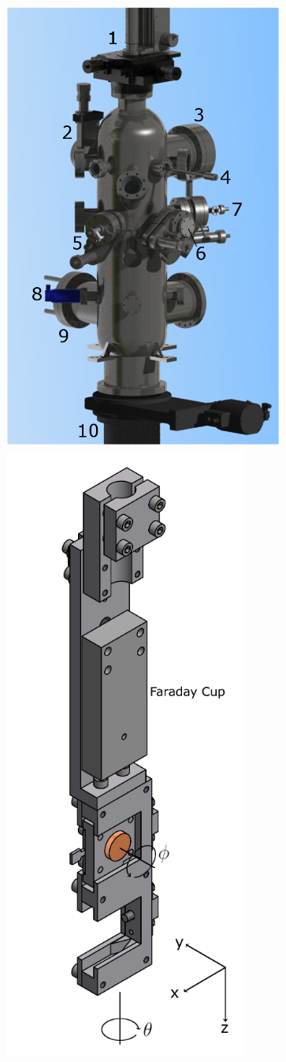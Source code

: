 \begin{figure}[h!]
    \centering
    \includegraphics[scale=0.35]{../Assets/IPES.png}
    \hfil
    \includegraphics[scale=0.35]{../Assets/sample holder.png}

\end{figure}
